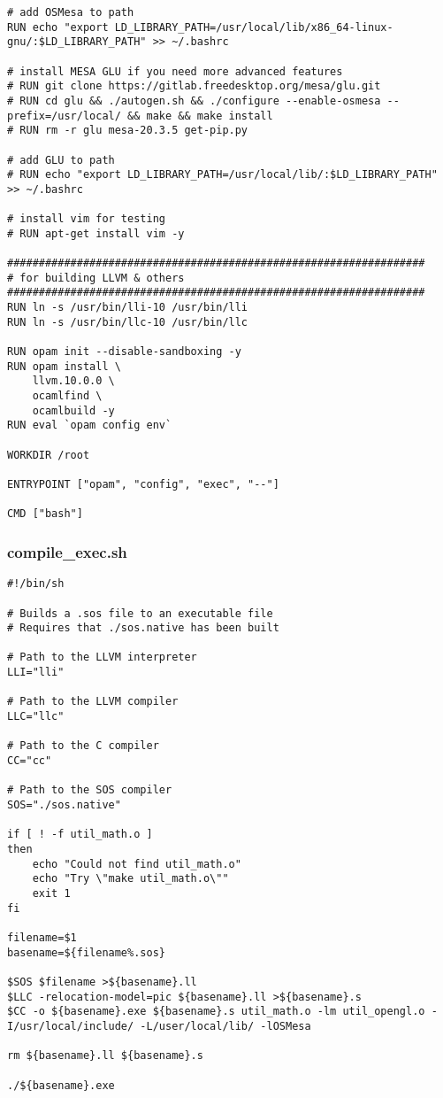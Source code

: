 \documentclass[main.tex]{subfiles}
\begin{document}
\begin{lstlisting}
# add OSMesa to path
RUN echo "export LD_LIBRARY_PATH=/usr/local/lib/x86_64-linux-gnu/:$LD_LIBRARY_PATH" >> ~/.bashrc

# install MESA GLU if you need more advanced features
# RUN git clone https://gitlab.freedesktop.org/mesa/glu.git
# RUN cd glu && ./autogen.sh && ./configure --enable-osmesa --prefix=/usr/local/ && make && make install
# RUN rm -r glu mesa-20.3.5 get-pip.py

# add GLU to path
# RUN echo "export LD_LIBRARY_PATH=/usr/local/lib/:$LD_LIBRARY_PATH" >> ~/.bashrc

# install vim for testing
# RUN apt-get install vim -y

##################################################################
# for building LLVM & others
##################################################################
RUN ln -s /usr/bin/lli-10 /usr/bin/lli
RUN ln -s /usr/bin/llc-10 /usr/bin/llc

RUN opam init --disable-sandboxing -y
RUN opam install \
    llvm.10.0.0 \
    ocamlfind \
    ocamlbuild -y
RUN eval `opam config env`

WORKDIR /root

ENTRYPOINT ["opam", "config", "exec", "--"]

CMD ["bash"]
\end{lstlisting}

\subsubsection{compile\_exec.sh}
\begin{lstlisting}
#!/bin/sh

# Builds a .sos file to an executable file
# Requires that ./sos.native has been built

# Path to the LLVM interpreter
LLI="lli"

# Path to the LLVM compiler
LLC="llc"

# Path to the C compiler
CC="cc"

# Path to the SOS compiler
SOS="./sos.native"

if [ ! -f util_math.o ]
then
    echo "Could not find util_math.o"
    echo "Try \"make util_math.o\""
    exit 1
fi

filename=$1
basename=${filename%.sos}

$SOS $filename >${basename}.ll
$LLC -relocation-model=pic ${basename}.ll >${basename}.s
$CC -o ${basename}.exe ${basename}.s util_math.o -lm util_opengl.o -I/usr/local/include/ -L/user/local/lib/ -lOSMesa

rm ${basename}.ll ${basename}.s

./${basename}.exe
\end{lstlisting}
\end{document}
